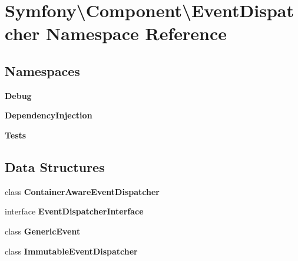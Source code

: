 \section{Symfony\textbackslash{}Component\textbackslash{}Event\+Dispatcher Namespace Reference}
\label{namespace_symfony_1_1_component_1_1_event_dispatcher}
\subsection*{Namespaces}
\begin{DoxyCompactItemize}
\item 
 {\bf Debug}
\item 
 {\bf Dependency\+Injection}
\item 
 {\bf Tests}
\end{DoxyCompactItemize}
\subsection*{Data Structures}
\begin{DoxyCompactItemize}
\item 
class {\bf Container\+Aware\+Event\+Dispatcher}
\item 
interface {\bf Event\+Dispatcher\+Interface}
\item 
class {\bf Generic\+Event}
\item 
class {\bf Immutable\+Event\+Dispatcher}
\end{DoxyCompactItemize}
